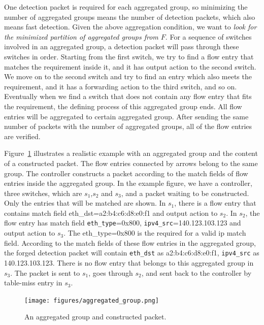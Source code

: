 One detection packet is required for each aggregated group, so minimizing the number of aggregated groups means the number of detection packets, which also means fast detection. Given the above aggregation condition, we want to \textit{look for the minimized partition of aggregated groups from $F$}. For a sequence of switches involved in an aggregated group, a detection packet will pass through these switches in order. Starting from the first switch, we try to find a flow entry that matches the requirement inside it, and it has output action to the second switch. We move on to the second switch and try to find an entry which also meets the requirement, and it has a forwarding action to the third switch, and so on. Eventually when we find a switch that does not contain any flow entry that fits the requirement, the defining process of this aggregated group ends. All flow entries will be aggregated to certain aggregated group. After sending the same number of packets with the number of aggregated groups, all of the flow entries are verified.

Figure~\ref{aggregated_group} illustrates a realistic example with an aggregated group and the content of a constructed packet. The flow entries connected by arrows belong to the same group. The controller constructs a packet according to the match fields of flow entries inside the aggregated group. In the example figure, we have a controller, three switches, which are $s_1$,$s_2$ and $s_3$, and a packet waiting to be constructed. Only the entries that will be matched are shown. In $s_1$, there is a flow entry that contains match field eth\_dst=a2:b4:c6:d8:e0:f1 and output action to $s_2$. In $s_2$, the flow entry has match field \texttt{eth\_type}=0x800, \texttt{ipv4\_src}=140.123.103.123 and output action to $s_3$. The eth\_type=0x800 is the required for a valid ip match field. According to the match fields of these flow entries in the aggregated group, the forged detection packet will contain \texttt{eth\_dst} as a2:b4:c6:d8:e0:f1, \texttt{ipv4\_src} as 140.123.103.123. There is no flow entry that belongs to this aggregated group in $s_3$. The packet is sent to $s_1$, goes through $s_2$, and sent back to the controller by table-miss entry in $s_3$. 

\begin{figure}[H]
\begin{center}
\texttt{[image: figures/aggregated\_group.png]}
\end{center}
\caption{An aggregated group and constructed packet.}
\label{aggregated_group}
\end{figure}

